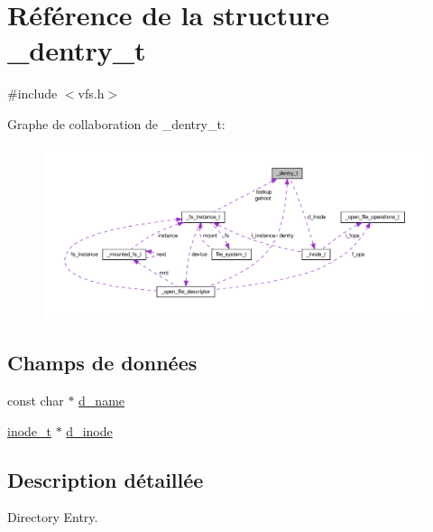 \hypertarget{struct__dentry__t}{\section{Référence de la structure \-\_\-dentry\-\_\-t}
\label{struct__dentry__t}
}


{\ttfamily \#include $<$vfs.\-h$>$}



Graphe de collaboration de \-\_\-dentry\-\_\-t\-:
\nopagebreak
\begin{figure}[H]
\begin{center}
\leavevmode
\includegraphics[width=350pt]{struct__dentry__t__coll__graph}
\end{center}
\end{figure}
\subsection*{Champs de données}
\begin{DoxyCompactItemize}
\item 
const char $\ast$ \hyperlink{struct__dentry__t_ac9b991f6f5d5c5ce60e8d256d667265e}{d\-\_\-name}
\item 
\hyperlink{vfs_8h_af51b41660b60ad79b490887fe6e22da9}{inode\-\_\-t} $\ast$ \hyperlink{struct__dentry__t_ac711731a0c08b35b5d2731b8545c7454}{d\-\_\-inode}
\end{DoxyCompactItemize}


\subsection{Description détaillée}
Directory Entry. 


